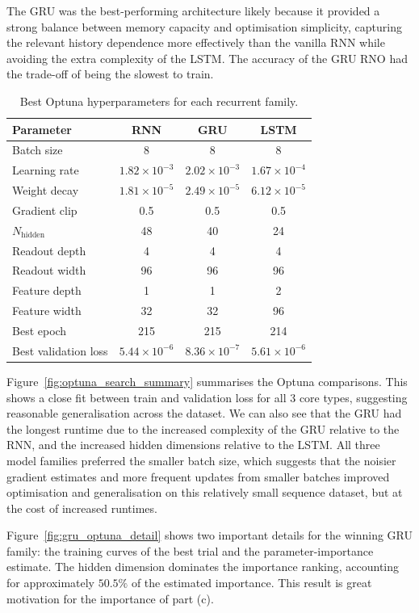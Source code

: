 \documentclass[11pt,a4paper, onecolumn]{article}
\begin{document}
The GRU was the best-performing architecture likely because it provided a strong balance between memory capacity and optimisation simplicity, capturing the relevant history dependence more effectively than the vanilla RNN while avoiding the extra complexity of the LSTM. The accuracy of the GRU RNO had the trade-off of being the slowest to train.



\begin{table}[t]
\centering
\caption{Best Optuna hyperparameters for each recurrent family.}
\label{tab:best_optuna_configs}
\begin{tabular}{lccc}
\toprule
Parameter & RNN & GRU & LSTM \\
\midrule
Batch size & 8 & 8 & 8 \\
Learning rate & $1.82\times10^{-3}$ & $2.02\times10^{-3}$ & $1.67\times10^{-4}$ \\
Weight decay & $1.81\times10^{-5}$ & $2.49\times10^{-5}$ & $6.12\times10^{-5}$ \\
Gradient clip & 0.5 & 0.5 & 0.5 \\
$N_{\mathrm{hidden}}$ & 48 & 40 & 24 \\
Readout depth & 4 & 4 & 4 \\
Readout width & 96 & 96 & 96 \\
Feature depth & 1 & 1 & 2 \\
Feature width & 32 & 32 & 96 \\
Best epoch & 215 & 215 & 214 \\
Best validation loss & $5.44\times10^{-6}$ & $8.36\times10^{-7}$ & $5.61\times10^{-6}$ \\
\bottomrule
\end{tabular}
\end{table}


Figure~\ref{fig:optuna_search_summary} summarises the Optuna comparisons. This shows a close fit between train and validation loss for all 3 core types, suggesting reasonable generalisation across the dataset. We can also see that the GRU had the longest runtime due to the increased complexity of the GRU relative to the RNN, and the increased hidden dimensions relative to the LSTM. All three model families preferred the smaller batch size, which suggests that the noisier gradient estimates and more frequent updates from smaller batches improved optimisation and generalisation on this relatively small sequence dataset, but at the cost of increased runtimes.

Figure~\ref{fig:gru_optuna_detail} shows two important details for the winning GRU family: the training curves of the best trial and the parameter-importance estimate. The hidden dimension dominates the importance ranking, accounting for approximately $50.5\%$ of the estimated importance. This result is great motivation for the importance of part (c).
\end{document}
